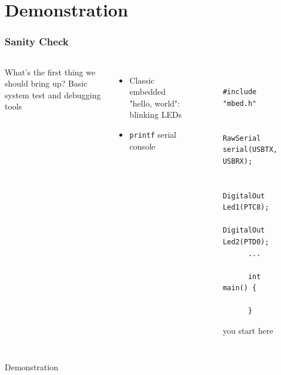 \documentclass{beamer}
\begin{document}
\section{Demonstration} %
\begin{frame}[fragile]
\frametitle{Sanity Check}
\begin{columns}[t]
  What's the first thing we should bring up?
  \hfill \break
  \hfill \break
   {
  Basic system test and debugging tools
  }
   {
  \begin{itemize}
      \item Classic embedded "hello, world": blinking LEDs
      \item \texttt{printf} serial console
  \end{itemize}
  }
  \begin{figure}
    \centering
    {\tiny
      \lstset{language=C++}
      \begin{lstlisting}
      #include "mbed.h"

      RawSerial serial(USBTX, USBRX);
      
      DigitalOut Led1(PTC8);
      DigitalOut Led2(PTD0);
      ...

      int main() {
      
      }
      \end{lstlisting}
    }
    you start here
  \end{figure}
\end{columns}
\end{frame}

\begin{frame}
\centering \huge Demonstration
\end{frame}
\end{document}
